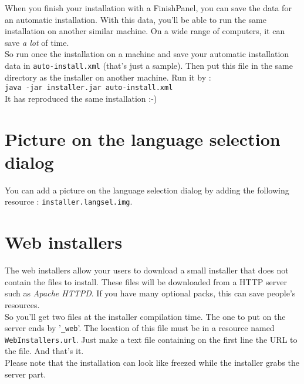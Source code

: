 When you finish your installation with a FinishPanel, you can save the data for
an automatic installation. With this data, you'll be able to run the same
installation on another similar machine. On a wide range of computers, it can
save \textsl{a lot} of time.\\

So run once the installation on a machine and save your automatic installation
data in \texttt{auto-install.xml} (that's just a sample). Then put this file in
the same directory as the installer on another machine. Run it by :\\
\texttt{java -jar installer.jar auto-install.xml}\\

It has reproduced the same installation :-)\\

\section{Picture on the language selection dialog}

You can add a picture on the language selection dialog by adding the following
resource : \texttt{installer.langsel.img}.\\

\section{Web installers}

The web installers allow your users to download a small installer that does not
contain the files to install. These files will be downloaded from a HTTP server
such as \textit{Apache HTTPD}. If you have many optional packs, this can save
people's resources.\\

So you'll get two files at the installer compilation time. The one to put on the
server ends by '\texttt{\_web}'. The location of this file must be in a resource
named \texttt{WebInstallers.url}. Just make a text file containing on the first
line the URL to the file. And that's it.\\

Please note that the installation can look like freezed while the installer
grabs the server part.\\
